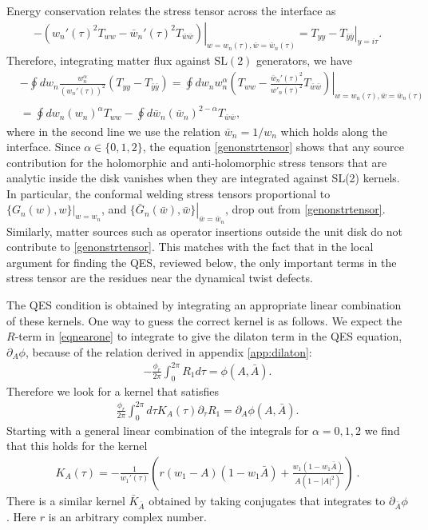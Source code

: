 \documentclass[12pt]{article}
\newcommand{\p}{\partial}
\newcommand{\f}{\frac}
\let\l=\lambda \let\m=\mu \let\n=\nu \let\x=\xi \let\p=\phi \let\r=v
\let\y=\psi
\let\f=\frac
\let\pa=\partial
\def\ba{\begin{eqnarray}}
\def\ea{\end{eqnarray}}
\renewcommand{\p}{\partial}
\numberwithin{equation}{section}
\def\m{{\mu}}
\def\n{{\nu}}
\def\p{{\phi}}
\def\ba{\begin{eqnarray}}
\def\ea{\end{eqnarray}}
\def\r{\rightarrow}
\def\f {\frac}
\def\l{\left}
\def\r{\right}
\def \bA {\bar{A}}
\def\y{\bar{y}}
\def\x{\bar{x}}
\renewcommand{\p}{\partial}
\begin{document}
\begin{spacing}{1.1}
Energy conservation relates the stress tensor across the interface as 
\ba\label{energyconservation}
\l. -\l( w_n'(\tau)^2 T_{ w w } -\bar{w}_n'(\tau)^2 T_{\bar{w} \bar{w}} \r)  \r|_{ w = w_n(\tau), \bar{w} = \bar{w}_n(\tau)} =  \l. {T}_{y y} - {T}_{\y \y}  \r|_{y= i\tau}.
\ea
Therefore, integrating  matter flux against $\text{SL}(2)$ generators, we have
\begin{align} \label{genonstrtensor}
&-\oint dw_n \frac{w_n^\alpha}{(w_n'(\tau))^2}  \l( {T}_{y y} - {T}_{\y \y}  \r) =  \l. \oint dw_n w_n^\alpha \l( T_{ww } - \f{\bar{w}_n'(\tau)^2}{w'_n(\tau)^2}T_{\bar{w}\bar{w}} \r)\r|_{ w = w_n(\tau), \bar{w} = \bar{w}_n(\tau)} \nonumber\\
& = \oint dw_n (w_n)^\alpha  T_{ww } - \oint d\bar{w}_n (\bar{w}_n)^{2-\alpha} T_{\bar{w} \bar{w}},
\end{align}
where in the second line we use the relation $\bar{w}_n = 1/w_{n}$ which holds along the interface.
 Since $\alpha \in \{0,1,2\}$, the equation \eqref{genonstrtensor} shows that any source contribution for the holomorphic and anti-holomorphic stress tensors that are analytic inside the disk vanishes when they are integrated against SL(2) kernels. In particular, the conformal welding stress tensors proportional to $\l. \{ G_n(w) , w\} \r|_{w=w_n}$, and $\l. \{ \bar{G}_n(\bar{w}) , \bar{w}\} \r|_{\bar{w}=\bar{w}_n}$, drop out from \eqref{genonstrtensor}. Similarly, matter sources such as operator insertions outside the unit disk do not contribute to \eqref{genonstrtensor}. This matches with the fact that in the local argument for finding the QES, reviewed below, the only important terms in the stress tensor are the residues near the dynamical twist defects.

The QES condition is obtained by integrating an appropriate linear combination of these kernels. One way to guess the correct kernel is as follows. We expect the $R$-term in \eqref{eqnearone} to integrate to give the dilaton term in the QES equation, $\p_A \phi$, because of the relation derived in appendix \ref{app:dilaton}:
\ba\label{dilatonintermR}
-\frac{\phi_r}{2\pi} \int_0^{2\pi} R_1 d\tau = \phi(A,\bA).
\ea
Therefore we look for a kernel that satisfies
\ba \label{kerdilaton}
\f{\phi_r}{2\pi}  \int_0^{2\pi} d\tau K_{A}(\tau) \pa_\tau R_1 = \pa_A \phi(A,\bA).
\ea
Starting with a general linear combination of the integrals for $\alpha= 0,1,2$ we find that this holds for the kernel
\ba \label{kernel}
K_A( \tau) = - \frac{1}{ w_1'(\tau)} \l( r (w_1-A)(1- w_1 \bA) + \frac{w_1 (1-w_1 \bA)}{A (1-|A|^2)}  \r) \ .
\ea
There is a similar kernel $\bar{K}_{\bar{A}}$ obtained by taking conjugates that integrates to $\p_{\bar{A}}\phi$. Here $r$ is an arbitrary complex number.


\end{spacing}
\end{document}
